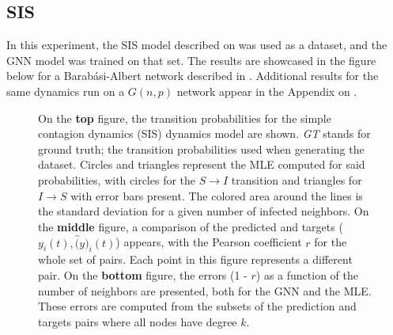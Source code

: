 \subsection{SIS}

In this experiment, the SIS model described on  was used
as a dataset, and the GNN model was trained on that set. The results
are showcased in the figure below for a Barab{\'a}si-Albert network
described in . Additional results for the same dynamics
run on a $G(n, p)$ network appear in the Appendix on .
\begin{figure}[H]
  \centering
  \caption[Results for BA network running SIS dynamics]{
    On the \textbf{top }figure, the transition probabilities for the simple
    contagion dynamics (SIS) dynamics model are shown. \textit{GT} stands
    for ground truth; the transition probabilities used when generating
    the dataset. Circles and triangles represent the MLE computed for said
    probabilities, with circles for the $S \rightarrow I$ transition and
    triangles for $I \rightarrow S$ with error bars present. The colored
    area around the lines is the standard deviation for a given number of
    infected neighbors. On the \textbf{middle} figure, a comparison of
    the predicted and targets ($y_i(t), \hat(y)_i(t)$) appears, with the Pearson
    coefficient $r$ for the whole set of pairs. Each point in this figure represents
    a different pair. On the \textbf{bottom} figure, the errors (1 - $r$) as a function
    of the number of neighbors are presented, both for the GNN and the MLE. These errors
    are computed from the subsets of the prediction and targets pairs where all
    nodes have degree $k$.
  }
  \label{fig:ba_sis}
\end{figure}

